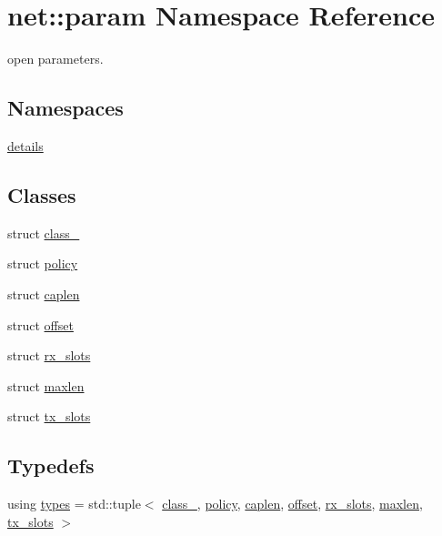 \hypertarget{namespacenet_1_1param}{\section{net\-:\-:param Namespace Reference}
\label{namespacenet_1_1param}
}


open parameters.  


\subsection*{Namespaces}
\begin{DoxyCompactItemize}
\item 
\hyperlink{namespacenet_1_1param_1_1details}{details}
\end{DoxyCompactItemize}
\subsection*{Classes}
\begin{DoxyCompactItemize}
\item 
struct \hyperlink{structnet_1_1param_1_1class__}{class\-\_\-}
\item 
struct \hyperlink{structnet_1_1param_1_1policy}{policy}
\item 
struct \hyperlink{structnet_1_1param_1_1caplen}{caplen}
\item 
struct \hyperlink{structnet_1_1param_1_1offset}{offset}
\item 
struct \hyperlink{structnet_1_1param_1_1rx__slots}{rx\-\_\-slots}
\item 
struct \hyperlink{structnet_1_1param_1_1maxlen}{maxlen}
\item 
struct \hyperlink{structnet_1_1param_1_1tx__slots}{tx\-\_\-slots}
\end{DoxyCompactItemize}
\subsection*{Typedefs}
\begin{DoxyCompactItemize}
\item 
using \hyperlink{namespacenet_1_1param_a08dbec045b170d7c25411fee7a5cc1ce}{types} = std\-::tuple$<$ \hyperlink{structnet_1_1param_1_1class__}{class\-\_\-}, \hyperlink{structnet_1_1param_1_1policy}{policy}, \hyperlink{structnet_1_1param_1_1caplen}{caplen}, \hyperlink{structnet_1_1param_1_1offset}{offset}, \hyperlink{structnet_1_1param_1_1rx__slots}{rx\-\_\-slots}, \hyperlink{structnet_1_1param_1_1maxlen}{maxlen}, \hyperlink{structnet_1_1param_1_1tx__slots}{tx\-\_\-slots} $>$
\end{DoxyCompactItemize}
